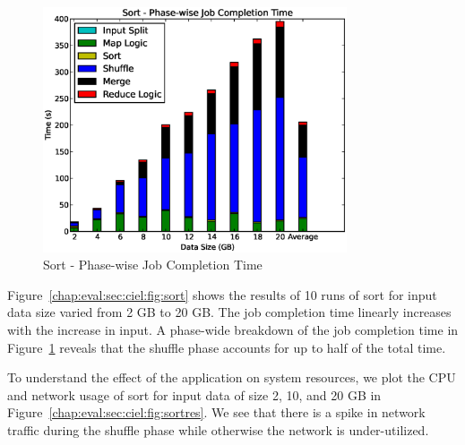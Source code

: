 \documentclass[a4paper,12pt,twoside,openright]{report}
\begin{document}
\begin{figure}[h!]
  \centering
    \includegraphics[width=0.8\textwidth]{sort_phase.eps}
    \caption{Sort - Phase-wise Job Completion Time}
    \label{chap:eval:sec:ciel:fig:sortphase}
\end{figure}

Figure~\ref{chap:eval:sec:ciel:fig:sort} shows the results of 10 runs of sort
for input data size varied from 2 GB to 20 GB. The job completion time linearly
increases with the increase in input. A phase-wide breakdown of the job
completion time in Figure~\ref{chap:eval:sec:ciel:fig:sortphase} reveals that
the shuffle phase accounts for up to half of the total time.

To understand the effect of the application on system resources, we plot the CPU
and network usage of sort for input data of size 2, 10, and 20 GB in
Figure~\ref{chap:eval:sec:ciel:fig:sortres}. We see that there is a spike in
network traffic during the shuffle phase while otherwise the network is
under-utilized.
\end{document}
